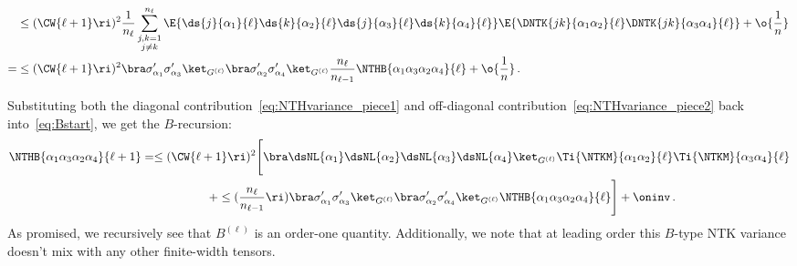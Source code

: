 \begin{align}\label{eq:NTHvariance_piece2}
&\le(\CW{\ell+1}\ri)^2\frac{1}{n_{\ell}}\sum_{\substack{j,k=1\\j\ne k}}^{n_{\ell}}\E{\ds{j}{\alpha_1}{\ell} \ds{k}{\alpha_2}{\ell} \ds{j}{\alpha_3}{\ell} \ds{k}{\alpha_4}{\ell}}\E{\DNTK{jk}{\alpha_1\alpha_2}{\ell}\DNTK{jk}{\alpha_3\alpha_4}{\ell} }+\o{\frac{1}{n}}\, \\
=&\le(\CW{\ell+1}\ri)^2\bra\sigma^{\prime}_{\alpha_1} \sigma^{\prime}_{\alpha_3} \ket_{G^{(\ell)}}\bra\sigma^{\prime}_{\alpha_2} \sigma^{\prime}_{\alpha_4}  \ket_{G^{(\ell)}}\frac{n_{\ell}}{n_{\ell-1}}\NTHB{\alpha_1\alpha_3\alpha_2\alpha_4}{\ell}+\o{\frac{1}{n}}\, .\nonumber
\end{align}





Substituting both the diagonal contribution~\eqref{eq:NTHvariance_piece1} and off-diagonal contribution~\eqref{eq:NTHvariance_piece2} back into~\eqref{eq:Bstart}, we get the $B$-recursion:
\begin{align}\label{eq:B-recursion}
\NTHB{\alpha_1\alpha_3\alpha_2\alpha_4}{\ell+1}&= \le(\CW{\ell+1}\ri)^2\Bigg[\bra \dsNL{\alpha_1} \dsNL{\alpha_2}  \dsNL{\alpha_3} \dsNL{\alpha_4}\ket_{G^{(\ell)}}  \Ti{\NTKM}{\alpha_1\alpha_2}{\ell} \Ti{\NTKM}{\alpha_3\alpha_4}{\ell} \\
&\ \ \ \ \ \ \ \ \ \ \ \ \ \ \ \ \  +  \le(\frac{n_\ell}{n_{\ell-1}} \ri) \bra\sigma^{\prime}_{\alpha_1} \sigma^{\prime}_{\alpha_3} \ket_{G^{(\ell)}}\bra\sigma^{\prime}_{\alpha_2} \sigma^{\prime}_{\alpha_4}  \ket_{G^{(\ell)}} \NTHB{\alpha_1\alpha_3\alpha_2\alpha_4}{\ell}\Bigg] +\oninv \, .\nonumber
\end{align}
As promised, we recursively see that $B^{(\ell)}$ is an order-one quantity. Additionally, we note that at leading order this $B$-type NTK variance doesn't mix with any other finite-width tensors.



